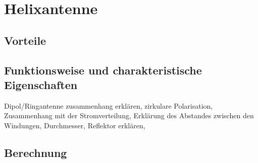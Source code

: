 \section{Helixantenne}

\subsection{Vorteile}

\subsection{Funktionsweise und charakteristische Eigenschaften}
Dipol/Ringantenne zusammenhang erklären, zirkulare Polarisation, Zusammenhang mit der Stromverteilung, Erklärung des Abstandes zwischen den Windungen, Durchmesser, Reflektor erklären,

\subsection{Berechnung}